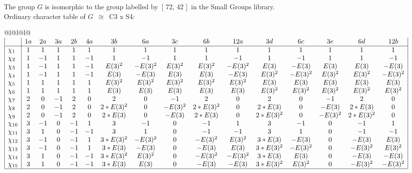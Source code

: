 \documentclass[varwidth=\maxdimen,border=10]{standalone}
\begin{document}
The group $G$ is isomorphic to the group labelled by\ [ 72, 42 ]\ in the Small Groups library.\\
Ordinary character table of $G$\ $\cong$\ C3 x S4:\\
\begin{center}
\begin{tabular}{@{}l@{}l@{}l@{}}
\hline
\(\begin{array}{|l|ccccccccccccccc|}
  & 1a & 2a & 3a & 2b & 4a & 3b & 6a & 3c & 6b & 12a & 3d & 6c & 3e & 6d & 12b\\ \hline
\chi_{1} & 1 & 1 & 1 & 1 & 1 & 1 & 1 & 1 & 1 & 1 & 1 & 1 & 1 & 1 & 1\\
\chi_{2} & 1 & -1 & 1 & 1 & -1 & 1 & -1 & 1 & 1 & -1 & 1 & -1 & 1 & 1 & -1\\
\chi_{3} & 1 & -1 & 1 & 1 & -1 & E(3)^{2} & -E(3)^{2} & E(3)^{2} & E(3)^{2} & -E(3)^{2} & E(3) & -E(3) & E(3) & E(3) & -E(3)\\
\chi_{4} & 1 & -1 & 1 & 1 & -1 & E(3) & -E(3) & E(3) & E(3) & -E(3) & E(3)^{2} & -E(3)^{2} & E(3)^{2} & E(3)^{2} & -E(3)^{2}\\
\chi_{5} & 1 & 1 & 1 & 1 & 1 & E(3)^{2} & E(3)^{2} & E(3)^{2} & E(3)^{2} & E(3)^{2} & E(3) & E(3) & E(3) & E(3) & E(3)\\
\chi_{6} & 1 & 1 & 1 & 1 & 1 & E(3) & E(3) & E(3) & E(3) & E(3) & E(3)^{2} & E(3)^{2} & E(3)^{2} & E(3)^{2} & E(3)^{2}\\
\chi_{7} & 2 & 0 & -1 & 2 & 0 & 2 & 0 & -1 & 2 & 0 & 2 & 0 & -1 & 2 & 0\\
\chi_{8} & 2 & 0 & -1 & 2 & 0 & 2*E(3)^{2} & 0 & -E(3)^{2} & 2*E(3)^{2} & 0 & 2*E(3) & 0 & -E(3) & 2*E(3) & 0\\
\chi_{9} & 2 & 0 & -1 & 2 & 0 & 2*E(3) & 0 & -E(3) & 2*E(3) & 0 & 2*E(3)^{2} & 0 & -E(3)^{2} & 2*E(3)^{2} & 0\\
\chi_{10} & 3 & -1 & 0 & -1 & 1 & 3 & -1 & 0 & -1 & 1 & 3 & -1 & 0 & -1 & 1\\
\chi_{11} & 3 & 1 & 0 & -1 & -1 & 3 & 1 & 0 & -1 & -1 & 3 & 1 & 0 & -1 & -1\\
\chi_{12} & 3 & -1 & 0 & -1 & 1 & 3*E(3)^{2} & -E(3)^{2} & 0 & -E(3)^{2} & E(3)^{2} & 3*E(3) & -E(3) & 0 & -E(3) & E(3)\\
\chi_{13} & 3 & -1 & 0 & -1 & 1 & 3*E(3) & -E(3) & 0 & -E(3) & E(3) & 3*E(3)^{2} & -E(3)^{2} & 0 & -E(3)^{2} & E(3)^{2}\\
\chi_{14} & 3 & 1 & 0 & -1 & -1 & 3*E(3)^{2} & E(3)^{2} & 0 & -E(3)^{2} & -E(3)^{2} & 3*E(3) & E(3) & 0 & -E(3) & -E(3)\\
\chi_{15} & 3 & 1 & 0 & -1 & -1 & 3*E(3) & E(3) & 0 & -E(3) & -E(3) & 3*E(3)^{2} & E(3)^{2} & 0 & -E(3)^{2} & -E(3)^{2}\\
\hline
\end{array}\)\\
\end{tabular}
\end{center}
\end{document}
